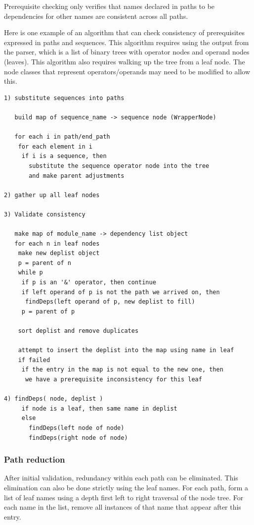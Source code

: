 \documentclass[draftmode]{memarticle}
\begin{document}
Prerequisite checking only verifies that names declared in paths
to be dependencies for other names are consistent across all paths.

Here is one example of an algorithm that can check consistency
of prerequisites expressed in paths and sequences.
This algorithm requires using the output from the parser,
which is a list of binary trees with operator nodes and
operand nodes (leaves).
This algorithm also requires walking up the tree from a leaf
node.  The node classes that represent operators/operands
may need to be modified to allow this.

\begin{verbatim}
1) substitute sequences into paths

   build map of sequence_name -> sequence node (WrapperNode)

   for each i in path/end_path 
    for each element in i
     if i is a sequence, then
       substitute the sequence operator node into the tree
       and make parent adjustments

2) gather up all leaf nodes

3) Validate consistency

   make map of module_name -> dependency list object
   for each n in leaf nodes
    make new deplist object
    p = parent of n
    while p
     if p is an '&' operator, then continue
     if left operand of p is not the path we arrived on, then
      findDeps(left operand of p, new deplist to fill)
     p = parent of p

    sort deplist and remove duplicates

    attempt to insert the deplist into the map using name in leaf
    if failed
     if the entry in the map is not equal to the new one, then
      we have a prerequisite inconsistency for this leaf

4) findDeps( node, deplist )
     if node is a leaf, then same name in deplist
     else
       findDeps(left node of node)
       findDeps(right node of node)
\end{verbatim}

\subsubsection{Path reduction}

After initial validation, redundancy within each path can be 
eliminated.
This elimination can also be done strictly using the leaf names.
For each path, form a list of leaf names using a depth first left
to right traversal of the node tree.  For each name in the list,
remove all instances of that name that appear after this entry.
\end{document}
